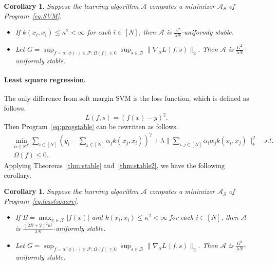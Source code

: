 \documentclass[11pt]{article}
\newtheorem{corollary}[theorem]{Corollary}
\newcommand{\R}{\mathbb{R}}
\newcommand{\calA}{\mathcal{A}}
\newcommand{\calD}{\mathcal{D}}
\newcommand{\calF}{\mathcal{F}}
\newcommand{\calX}{\mathcal{X}}
\begin{document}
	\begin{corollary}
		\label{cor:SVM}
		Suppose the learning algorithm $\calA$ computes a minimizer $\calA_S$ of Program~\eqref{eq:SVM}.
		\begin{itemize}
			\item If $k(x_i,x_i)\leq \kappa^2<\infty$ for each $i\in [N]$, then $\calA$ is $\frac{\kappa^2}{\lambda N}$-uniformly stable.
			\item Let $G = \sup_{f=\alpha^\top \phi(\cdot)\in \calF: \Omega(f)\leq 0} \sup_{s\in \calD} \|\nabla_\alpha L(f,s)\|_2$.
			Then $\calA$ is $\frac{G^2}{\lambda N}$-uniformly stable.
		\end{itemize} 
	\end{corollary}
	
	\paragraph{Least square regression.}
	The only difference from soft margin SVM is the loss function, which is defined as follows.
	\[
	L(f,s) = (f(x)-y)^2.
	\]
	Then Program~\eqref{eq:progstable} can be rewritten as follows.
	\begin{equation} \tag{LS}
	\label{eq:leastsquare}
	\begin{split}
	& \min_{\alpha\in \R^N} \sum_{i\in [N]} \left(y_i-\sum_{j\in [N]} \alpha_j k(x_j,x_i)\right)^2 + \lambda \|\sum_{i,j\in [N]}\alpha_i \alpha_j k(x_i,x_j)\|_k^2 \quad s.t. \\
	& ~ \Omega(f)\leq 0.
	\end{split}
	\end{equation}
	Applying Theorems~\ref{thm:stable} and~\ref{thm:stable2}, we have the following corollary.
	
	\begin{corollary}
		\label{cor:leastsquare}
		Suppose the learning algorithm $\calA$ computes a minimizer $\calA_S$ of Program~\eqref{eq:leastsquare}.
		\begin{itemize}
			\item If $B=\max_{x\in \calX} |f(x)|$ and $k(x_i,x_i)\leq \kappa^2<\infty$ for each $i\in [N]$, then $\calA$ is $\frac{(2B+2)^2\kappa^2}{\lambda N}$-uniformly stable.
			\item Let $G = \sup_{f=\alpha^\top \phi(\cdot)\in \calF: \Omega(f)\leq 0} \sup_{s\in \calD} \|\nabla_\alpha L(f,s)\|_2$.
			Then $\calA$ is $\frac{G^2}{\lambda N}$-uniformly stable.
		\end{itemize}
	\end{corollary}
	
\end{document}

